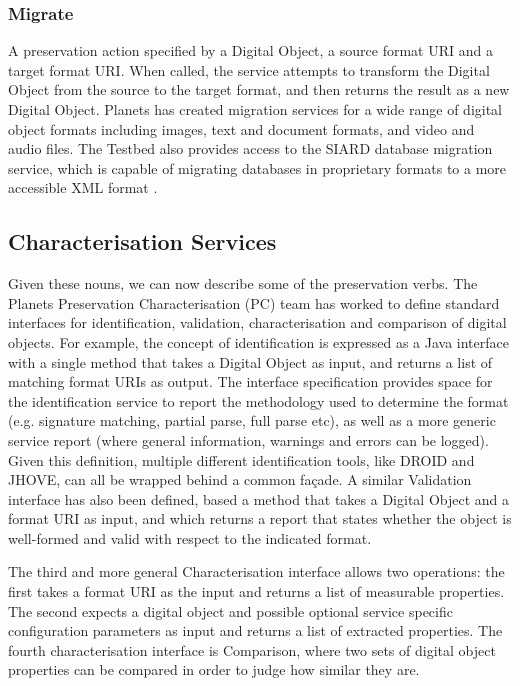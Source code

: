 \documentclass{article}
\begin{document}
\subsubsection{Migrate}
\label{ss-pa}
A preservation action specified by a Digital Object, a source format URI and a
target format URI. When called, the service attempts to transform the Digital
Object from the source to the target format, and then returns the result as a new
Digital Object. Planets has created migration services for a wide range of
digital object formats including images, text and document formats, and video and
audio files.  The Testbed also provides access to the SIARD database migration
service, which is capable of migrating databases in proprietary formats to a more
accessible XML format \cite{heusher-siard}.


\subsection{Characterisation Services}
Given these nouns, we can now describe some of the preservation verbs. The
Planets Preservation Characterisation (PC) team has worked to define standard
interfaces for identification, validation, characterisation and comparison of
digital objects. For example, the concept of identification is expressed as a
Java interface with a single method that takes a Digital Object as input, and
returns a list of matching format URIs as output. The interface specification
provides space for the identification service to report the methodology used to
determine the format (e.g. signature matching, partial parse, full parse etc), as
well as a more generic service report (where general information, warnings and
errors can be logged). Given this definition, multiple different identification
tools, like DROID and JHOVE, can all be wrapped behind a common fa\c{c}ade.  A
similar Validation interface has also been defined, based a method that takes a
Digital Object and a format URI as input, and which returns a report that states
whether the object is well-formed and valid with respect to the indicated format.

The third and more general Characterisation interface allows two operations: the
first takes a format URI as the input and returns a list of measurable
properties. The second expects a digital object and possible optional service
specific configuration parameters as input and returns a list of extracted
properties.  The fourth characterisation interface is Comparison, where two sets
of digital object properties can be compared in order to judge how similar they
are.
\end{document}
